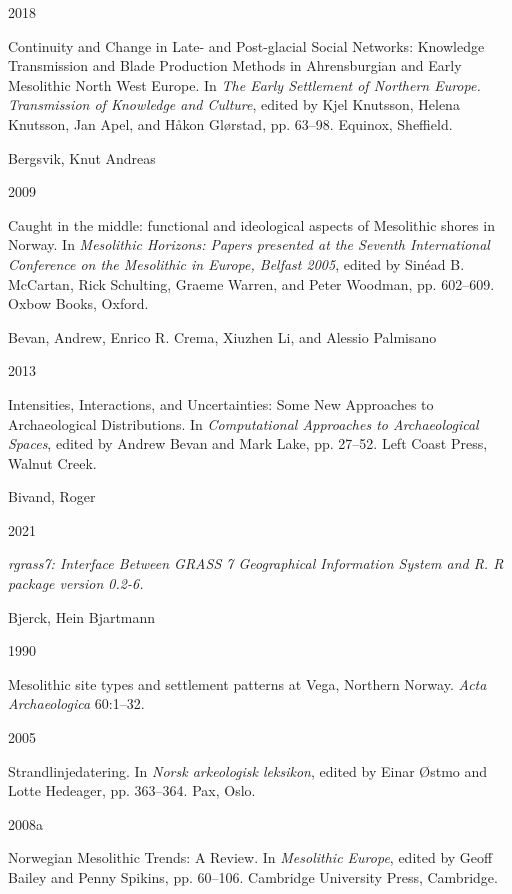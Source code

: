 \documentclass[
]{article}
\newlength{\cslhangindent}
\newlength{\csllabelwidth}
\newlength{\cslentryspacingunit} %
\newenvironment{CSLReferences}[2] %
 {%
  \setlength{\parindent}{0pt}
  \ifodd #1
  \let\oldpar\par
  \def\par{\hangindent=\cslhangindent\oldpar}
  \fi
  \setlength{\parskip}{#2\cslentryspacingunit}
 }%
 {}
\newcommand{\CSLBlock}[1]{#1\hfill\break}
\newcommand{\CSLLeftMargin}[1]{\parbox[t]{\csllabelwidth}{#1}}
\newcommand{\CSLRightInline}[1]{\parbox[t]{\linewidth - \csllabelwidth}{#1}\break}
\begin{document}
\begin{CSLReferences}{0}{0}
\leavevmode{}%
\CSLLeftMargin{ 2018 }
\CSLRightInline{{Continuity and Change in Late- and Post-glacial Social Networks: Knowledge Transmission and Blade Production Methods in Ahrensburgian and Early Mesolithic North West Europe}. In \emph{{The Early Settlement of Northern Europe. Transmission of Knowledge and Culture}}, edited by Kjel Knutsson, Helena Knutsson, Jan Apel, and Håkon Glørstad, pp. 63--98. Equinox, Sheffield.}

\leavevmode{}%
\CSLBlock{Bergsvik, Knut Andreas}
\CSLLeftMargin{ 2009}
\CSLRightInline{{Caught in the middle: functional and ideological aspects of Mesolithic shores in Norway}. In \emph{{Mesolithic Horizons: Papers presented at the Seventh International Conference on the Mesolithic in Europe, Belfast 2005}}, edited by Sinéad B. McCartan, Rick Schulting, Graeme Warren, and Peter Woodman, pp. 602--609. Oxbow Books, Oxford.}

\leavevmode{}%
\CSLBlock{Bevan, Andrew, Enrico R. Crema, Xiuzhen Li, and Alessio Palmisano}
\CSLLeftMargin{ 2013}
\CSLRightInline{{Intensities, Interactions, and Uncertainties: Some New Approaches to Archaeological Distributions}. In \emph{{Computational Approaches to Archaeological Spaces}}, edited by Andrew Bevan and Mark Lake, pp. 27--52. Left Coast Press, Walnut Creek.}

\leavevmode{}%
\CSLBlock{Bivand, Roger}
\CSLLeftMargin{ 2021}
\CSLRightInline{\emph{{rgrass7: Interface Between GRASS 7 Geographical Information System and R. R package version 0.2-6.}}}

\leavevmode{}%
\CSLBlock{Bjerck, Hein Bjartmann}
\CSLLeftMargin{ 1990}
\CSLRightInline{{Mesolithic site types and settlement patterns at Vega, Northern Norway}. \emph{Acta Archaeologica} 60:1--32.}

\leavevmode{}%
\CSLLeftMargin{ 2005 }
\CSLRightInline{Strandlinjedatering. In \emph{Norsk arkeologisk leksikon}, edited by Einar Østmo and Lotte Hedeager, pp. 363--364. Pax, Oslo.}

\leavevmode{}%
\CSLLeftMargin{ 2008a }
\CSLRightInline{{Norwegian Mesolithic Trends: A Review}. In \emph{{Mesolithic Europe}}, edited by Geoff Bailey and Penny Spikins, pp. 60--106. Cambridge University Press, Cambridge.}


\end{CSLReferences}
\end{document}
